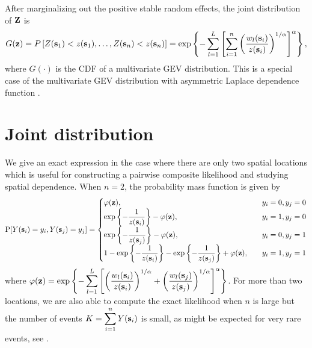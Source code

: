 After marginalizing out the positive stable random effects, the joint distribution of $\mathbf{Z}$ is
\begin{align}\label{rbeq:jointCDF}
G(\mathbf{z}) = P\left[Z(\mathbf{s}_1) < z(\mathbf{s}_1), \ldots, Z(\mathbf{s}_n) < z(\mathbf{s}_n)\right] = \exp\left\{-\sum_{l=1}^L\left[\sum_{i=1}^n\left(\frac{w_{l}(\mathbf{s}_i)}{z(\mathbf{s}_i)}\right)^{1/\alpha}\right]^{\alpha}\right\},
\end{align}
where $G(\cdot)$ is the CDF of a multivariate GEV distribution.
This is a special case of the multivariate GEV distribution with asymmetric Laplace dependence function \citep{Tawn1990}.

\section{Joint distribution}\label{rbs:multivariate}

We give an exact expression in the case where there are only two spatial locations which is useful for constructing a pairwise composite likelihood \citep{Padoan2010} and studying spatial dependence.
When $n = 2$, the probability mass function is given by
\begin{align} \label{rbeq:biv}
\text{P}[Y(\mathbf{s}_i) = y_i, Y(\mathbf{s}_j) = y_j] = \begin{cases}
\varphi(\mathbf{z}), &y_i = 0, y_j = 0\\
\exp\left\{ - \displaystyle \frac{ 1 }{ z(\mathbf{s}_i) } \right\} - \varphi(\mathbf{z}), &y_i = 1, y_j = 0 \\
\exp\left\{ - \displaystyle \frac{ 1 }{ z(\mathbf{s}_j) } \right\} - \varphi(\mathbf{z}), &y_i = 0, y_j = 1 \\
1 - \exp\left\{ - \displaystyle\frac{ 1 }{ z(\mathbf{s}_i) } \right\} - \exp \left\{ -\displaystyle \frac{ 1 }{z(\mathbf{s}_j)} \right\} + \varphi(\mathbf{z}), \quad &y_i = 1, y_j = 1
\end{cases}
\end{align}
where $\varphi(\mathbf{z}) = \exp \left\{ - \displaystyle \sum_{ l = 1 }^{ L } \left[ \left( \displaystyle \frac{ w_{ l }(\mathbf{s}_i) }{ z(\mathbf{s}_i) } \right)^{1/\alpha} + \left( \displaystyle \frac{ w_{l }(\mathbf{s}_j)}{z(\mathbf{s}_j)} \right)^{1/\alpha} \right]^{\alpha} \right\}$.
For more than two locations, we are also able to compute the exact likelihood when $n$ is large but the number of events $K = \displaystyle \sum_{i = 1}^n Y(\mathbf{s}_i)$ is small, as might be expected for very rare events, see .


